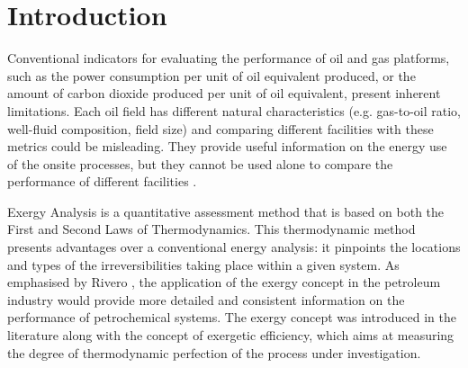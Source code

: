 \documentclass[times,3p]{elsarticle}
\begin{document}
%



\section{Introduction}
\label{sec:introduction}
	

\begin{table}[!t]
  \begin{framed}
  \scriptsize
    \printnomenclature
  \end{framed}
\end{table}

Conventional indicators for evaluating the performance of oil and gas platforms, such as the power consumption per unit of oil equivalent produced, or the amount of carbon dioxide produced per unit of oil equivalent, present inherent limitations. Each oil field has different natural characteristics (e.g. gas-to-oil ratio, well-fluid composition, field size) and comparing different facilities with these metrics could be misleading. They provide useful information on the energy use of the onsite processes, but they cannot be used alone to compare the performance of different facilities \cite{Svalheim2002,Svalheim2003}.

Exergy Analysis is a quantitative assessment method that is based on both the First and Second Laws of Thermodynamics. This thermodynamic method presents advantages over a conventional energy analysis: it pinpoints the locations and types of the irreversibilities taking place within a given system. As emphasised by Rivero \cite{Rivero2002}, the application of the exergy concept in the petroleum industry would provide more detailed and consistent information on the performance of petrochemical systems. The exergy concept was introduced in the literature along with the concept of exergetic efficiency, which aims at measuring the degree of thermodynamic perfection of the process under investigation.  
\end{document}
